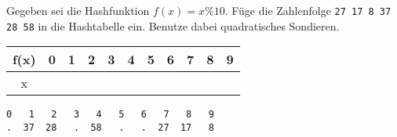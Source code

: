 
\renewcommand{\arraystretch}{2.0}
\setlength{\tabcolsep}{14pt}
\question[3]
Gegeben sei die Hashfunktion $f(x) = x \% 10$.
Füge die Zahlenfolge
\texttt{27 17 8 37 28 58}  in die Hashtabelle ein.
Benutze dabei quadratisches Sondieren.

\begin{tabular}{|c|c|c|c|c|c|c|c|c|c|c|}
\hline f(x) & 0 & 1 & 2 & 3 & 4 & 5 & 6 & 7 & 8 & 9 \\
\hline x     &   &    &    &   &   &    &    &   &   & \\
\hline
\end{tabular}

\ifprintanswers
\begin{solutionbox}{2cm}
\begin{lstlisting}
0   1   2   3   4   5   6   7   8   9
.  37  28   .  58   .   .  27  17   8
\end{lstlisting}
\end{solutionbox}
\fi
